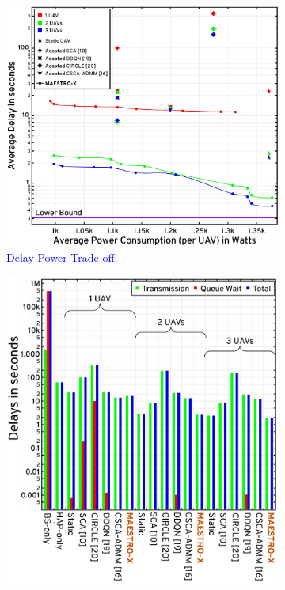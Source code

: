 \documentclass[12pt, draftcls, onecolumn]{IEEEtran}
\theoremstyle{plain}
\theoremstyle{definition}
\theoremstyle{remark}
\newcommand\hlt[1]{\textcolor{blue}{#1}}
\begin{document}
\begin{figure} [t]
     \begin{subfigure}{0.55\linewidth}
         \centering
         \includegraphics[width=1.0\linewidth]{figs/Delay_Power_10Mb_Scatter_Low_Congestion.jpg}
         \caption{\hlt{Delay-Power Trade-off.}}
         \label{F8}
     \end{subfigure}
     \hfill
     \begin{subfigure}{0.433\linewidth}
         \centering
         \includegraphics[width=1.0\linewidth]{figs/Delay_Power_10Mb_Chart_Low_Congestion.jpeg}

\end{subfigure}
\end{figure}
\end{document}
